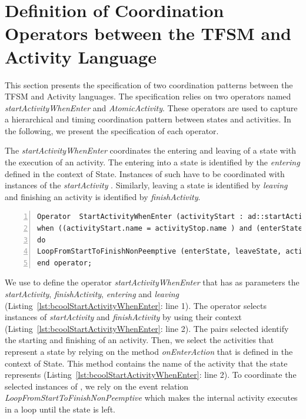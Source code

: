 \section{Definition of Coordination Operators between the TFSM and Activity Language}
This section presents the \bcool specification of two coordination patterns between the TFSM and Activity languages. The specification relies on two operators named \emph{startActivityWhenEnter} and \emph{AtomicActivity}. These operators are used to capture a hierarchical and timing coordination pattern between states and activities. In the following, we present the \bcool specification of each operator.    


The \emph{startActivityWhenEnter} coordinates the entering and leaving of a state with the execution of an activity. The entering into a state is identified by the \textit{entering} \dse defined in the context of State. Instances of such \dse have to be coordinated with instances of the \textit{startActivity} \dse. Similarly, leaving a state is identified by \dse \textit{leaving} and finishing an activity is identified by \dse \textit{finishActivity}. 

\begin{lstlisting}[language=bcool,
caption={Hierarchical operator between TFSM and Activity languages},
label={lst:bcoolStartActivityWhenEnter}, 
basicstyle=\scriptsize\ttfamily, backgroundcolor=\color{LGrey}, numbers=left, xleftmargin=2pt]
Operator  StartActivityWhenEnter (activityStart : ad::startActivity , activityStop : ad::finishActivity, enterState : tfsm::entering, leaveState : tfsm::leaving)
when ((activityStart.name = activityStop.name ) and (enterState.name = leaveState.name) and (activityStart.name = enterState.onEnterAction.name));
do 
LoopFromStartToFinishNonPeemptive (enterState, leaveState, activityStart, activityStop)
end operator;
\end{lstlisting}

We use \bcool to define the operator \emph{startActivityWhenEnter} that has as parameters the \dse \textit{startActivity}, \textit{finishActivity}, \textit{entering} and \textit{leaving} (Listing~\ref{lst:bcoolStartActivityWhenEnter}: line 1). The operator selects instances of \dse \emph{startActivity} and \emph{finishActivity} by using their context (Listing~\ref{lst:bcoolStartActivityWhenEnter}: line 2). The pairs selected identify the starting and finishing of an activity. Then, we select the activities that represent a state by relying on the method \emph{onEnterAction} that is defined in the context of State. This method contains the name of the activity that the state represents (Listing~\ref{lst:bcoolStartActivityWhenEnter}: line 2). To coordinate the selected instances of \dse, we rely on the event relation \emph{LoopFromStartToFinishNonPeemptive} which makes the internal activity executes in a loop until the state is left. 


